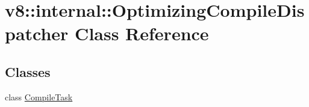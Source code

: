 \hypertarget{classv8_1_1internal_1_1_optimizing_compile_dispatcher}{}\section{v8\+:\+:internal\+:\+:Optimizing\+Compile\+Dispatcher Class Reference}
\label{classv8_1_1internal_1_1_optimizing_compile_dispatcher}
\subsection*{Classes}
\begin{DoxyCompactItemize}
\item 
class \hyperlink{classv8_1_1internal_1_1_optimizing_compile_dispatcher_1_1_compile_task}{Compile\+Task}
\end{DoxyCompactItemize}
